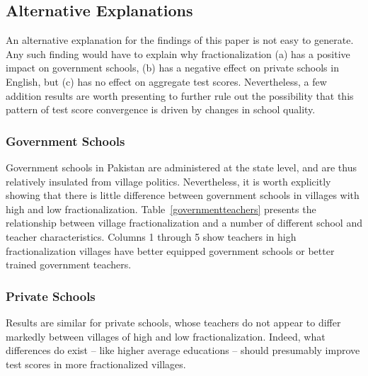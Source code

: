 \documentclass[12pt]{article}
\begin{document}



\subsection{Alternative Explanations}\label{}
An alternative explanation for the findings of this paper is not easy to generate. Any such finding would have to explain why fractionalization (a) has a positive impact on government schools, (b) has a negative effect on private schools in English, but (c) has no effect on aggregate test scores. Nevertheless, a few addition results are worth presenting to further rule out the possibility that this pattern of test score convergence is driven by changes in school quality. 

\subsubsection{Government Schools}\label{} 
Government schools in Pakistan are administered at the state level, and are thus relatively insulated from village politics. Nevertheless, it is worth explicitly showing that there is little difference between government schools in villages with high and low fractionalization. Table~\ref{governmentteachers} presents the relationship between village fractionalization and a number of different school and teacher characteristics. Columns 1 through 5 show teachers in high fractionalization villages have better equipped government schools or better trained government teachers. 



\subsubsection{Private Schools}\label{} 

Results are similar for private schools, whose teachers do not appear to differ markedly between villages of high and low fractionalization. Indeed, what differences do exist -- like higher average educations -- should presumably improve test scores in more fractionalized villages. 


\end{document}
